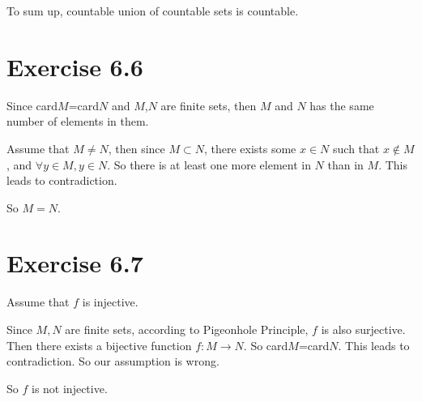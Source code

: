 \documentclass[a4paper,12pt,titlepage]{article}
\begin{document}
To sum up, countable union of countable sets is countable.
\section*{Exercise 6.6}
Since card$M$=card$N$ and $M$,$N$ are finite sets, then $M$ and $N$ has the same number of elements in them.

Assume that $M\neq N$, then since $M\subset N$, there exists some $x\in N$ such that $x\notin M$, and $\forall y\in M, y\in N$. So there is at least one more element in $N$ than in $M$. This leads to contradiction.

So $M=N.$




\section*{Exercise 6.7}
Assume that $f$ is injective.

Since $M,N$ are finite sets, according to Pigeonhole Principle, $f$ is also surjective. Then there exists a bijective function $f:M\rightarrow N$. So  card$M$=card$N$. This leads to contradiction. So our assumption is wrong.

So $f$ is not injective. 
\end{document}

